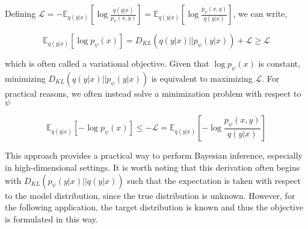 Defining $\mathcal{L} = -\mathbb{E}_{q(y \lvert x)}\left[\log \frac{q(y\lvert x)}{p_{\psi}(x,y)} \right]  = \mathbb{E}_{q(y \lvert x)}\left[\log \frac{p_{\psi}(x,y)}{q(y\lvert x)} \right] $, we can write,

\begin{equation}
\mathbb{E}_{q(y \lvert x)}\left[\log p_{\psi}(x) \right] = D_{KL}(q(y \lvert x) \lvert\lvert p_{\psi}(y\lvert x)) + \mathcal{L} \geq \mathcal{L}
\end{equation}

which is often called a variational objective. Given that \( \log p_{\psi}(x) \) is constant, minimizing $D_{KL}(q(y \lvert x) \lvert\lvert p_{\psi}(y\lvert x))$ is equivalent to maximizing $\mathcal{L}$. For practical reasons, we often instead solve a minimization problem with respect to $\psi$

\begin{equation}
\mathbb{E}_{q(y \lvert x)}\left[-\log p_{\psi}(x) \right] \leq -\mathcal{L} = \mathbb{E}_{q(y \lvert x)}\left[-\log \frac{p_{\psi}(x,y)}{q(y\lvert x)} \right]
\end{equation}

This approach provides a practical way to perform Bayesian inference, especially in high-dimensional settings. It is worth noting that this derivation often begins with $D_{KL}(p_{\psi}(y\lvert x) \lvert\lvert q(y \lvert x) ) $ such that the expectation is taken with respect to the model distribution, since the true distribution is unknown. However, for the following application, the target distribution is known and thus the objective is formulated in this way. 





